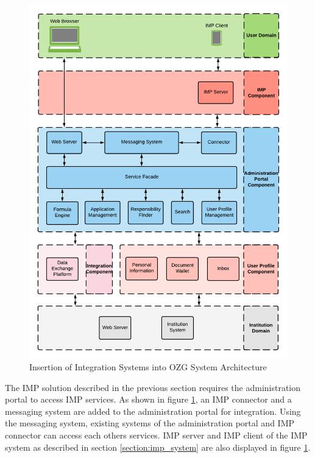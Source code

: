 \begin{figure}[h!]
    \centering
    \includegraphics[scale=0.6]{Diagrams/Integration Architecture 1/Technological Integration/1. Integration Overview.pdf}
    \caption{Insertion of Integration Systems into OZG System Architecture}
    \label{integration1:integration_overview}
\end{figure}

The IMP solution described in the previous section requires the administration portal to access IMP services. As shown in figure \ref{integration1:integration_overview}, an IMP connector and a messaging system are added to the administration portal for integration. Using the messaging system, existing systems of the administration portal and IMP connector can access each others services. IMP server and IMP client of the IMP system as described in section \ref{section:imp_system} are also displayed in figure \ref{integration1:integration_overview}.

